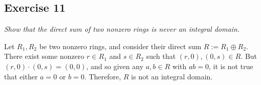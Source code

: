 \subsection*{Exercise 11}
\textit{Show that the direct sum of two nonzero rings is never an integral domain.}

\vspace{5 mm}
Let $R_1, R_2$ be two nonzero rings, and consider their direct sum $R := R_1 \oplus R_2$. There exist some nonzero $r \in R_1$ and $s \in R_2$ such that $(r,0), (0,s) \in R$. But $(r,0)\cdot(0,s) = (0,0)$, and so given any $a,b \in R$ with $ab = 0$, it is not true that either $a=0$ or $b=0$. Therefore, $R$ is not an integral domain.